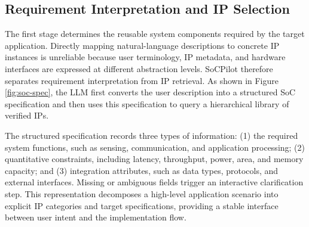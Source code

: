 \subsection{Requirement Interpretation and IP Selection}
The first stage determines the reusable system components required by the target application. Directly mapping natural-language descriptions to concrete IP instances is unreliable because user terminology, IP metadata, and hardware interfaces are expressed at different abstraction levels. SoCPilot therefore separates requirement interpretation from IP retrieval. As shown in Figure \ref{fig:soc-spec}, the LLM first converts the user description into a structured SoC specification and then uses this specification to query a hierarchical library of verified IPs.



The structured specification records three types of information: (1) the required system functions, such as sensing, communication, and application processing; (2) quantitative constraints, including latency, throughput, power, area, and memory capacity; and (3) integration attributes, such as data types, protocols, and external interfaces. Missing or ambiguous fields trigger an interactive clarification step. This representation decomposes a high-level application scenario into explicit IP categories and target specifications, providing a stable interface between user intent and the implementation flow.

